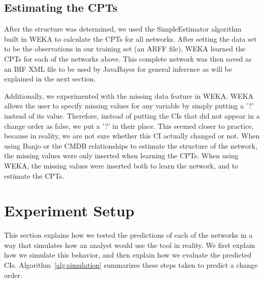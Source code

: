 \documentclass[10pt,twocolumn,letterpaper]{article}
\begin{document}
\subsection{Estimating the CPTs}
\label{sec:cpt}

After the structure was determined, we used the SimpleEstimator algorithm~\cite{witten2005data} built in WEKA to calculate the CPTs for all networks. After
setting the data set to be the observations in our training set (an ARFF file), WEKA learned the CPTs for each of the
networks above. This complete network was then saved as an BIF XML file to be used by JavaBayes for general inference as will be explained in the next section.

Additionally, we experimented with the missing data feature in WEKA. WEKA allows the user to specify missing values
for any variable by simply putting a '?' instead of its value. Therefore, instead of putting the CIs that did not appear in a change order as false, we put a
'?' in their place. This seemed closer to practice, because in reality, we are not sure whether this CI actually changed or not. When using Banjo or the CMDB
relationships to estimate the structure of the network, the missing values were only inserted when learning the CPTs. When using WEKA, the missing values were
inserted both to learn the network, and to estimate the CPTs.


\section{Experiment Setup}
\label{sec:setup}

This section explains how we tested the predictions of each of the networks in a way that simulates how an analyst would use the tool in reality. We first
explain how we simulate this behavior, and then explain how we evaluate the predicted CIs. Algorithm~\ref{alg:simulation} summarizes these steps taken to
predict a change order.
\end{document}
